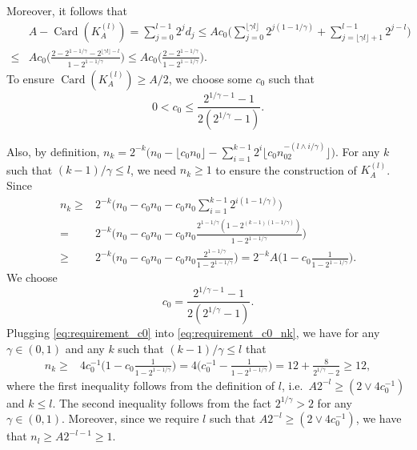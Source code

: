 \documentclass[11pt]{article}
\DeclareMathOperator*{\card}{Card}
\theoremstyle{plain}
\theoremstyle{definition}
\begin{document}
Moreover, it follows that
\begin{equation*}
\begin{aligned}
    &A - \card(K_A^{(l)}) = \sum_{j = 0}^{l-1}2^jd_j \leq Ac_0\Big(\sum_{j = 0}^{\lfloor \gamma l \rfloor}2^{j(1-1/\gamma)} + \sum_{j = \lfloor \gamma l \rfloor + 1}^{l-1}2^{j-l}\Big)\\
    \leq& Ac_0\Big(\frac{2 - 2^{1-1/\gamma} - 2^{\lfloor \gamma l\rfloor - l}}{1-2^{1-1/\gamma}}\Big) \leq Ac_0\Big(\frac{2 - 2^{1-1/\gamma}}{1-2^{1-1/\gamma}}\Big).
\end{aligned}
\end{equation*}
To ensure $\card(K_A^{(l)}) \geq A/2$, we choose some $c_0$ such that
\begin{equation}\label{eq:c0}
    0 < c_0 \leq \frac{2^{1/\gamma-1}-1}{2(2^{1/\gamma}-1)}. 
\end{equation}

Also, by definition, $n_k = 2^{-k}\big(n_0 - \lfloor c_0n_0 \rfloor - \sum_{i = 1}^{k-1}2^i\lfloor c_0n_02^{-(l \wedge i/\gamma)} \rfloor\big)$. For any $k$ such that $(k - 1)/\gamma \leq l$, we need $n_k \geq 1$ to ensure the construction of $K_A^{(l)}$. Since 
    \begin{equation}\label{eq:requirement_c0_nk}
    \begin{aligned}
        n_k \geq& 2^{-k}\Big(n_0 - c_0n_0 - c_0n_0\sum_{i = 1}^{k-1}2^{i(1-1/\gamma)}\Big)\\
        =& 2^{-k}\Big(n_0 - c_0n_0 - c_0n_0\frac{2^{1-1/\gamma}(1-2^{(k-1)(1-1/\gamma)})}{1-2^{1-1/\gamma}}\Big)\\
        \geq& 2^{-k}\Big(n_0 - c_0n_0 - c_0n_0\frac{2^{1-1/\gamma}}{1-2^{1-1/\gamma}}\Big) = 2^{-k}A\Big(1 - c_0\frac{1}{1-2^{1-1/\gamma}}\Big).
    \end{aligned}
    \end{equation}
    We choose 
    \begin{equation}\label{eq:requirement_c0}
    c_0 = \frac{2^{1/\gamma-1}-1}{2(2^{1/\gamma}-1)}.
    \end{equation}
    Plugging \eqref{eq:requirement_c0} into \eqref{eq:requirement_c0_nk}, we have for any $\gamma \in (0, 1)$ and any $k$ such that $(k - 1)/\gamma \leq l$ that
    \begin{equation*}
    \begin{aligned}
        n_k \geq& 4c_0^{-1}\Big(1 - c_0\frac{1}{1-2^{1-1/\gamma}}\Big) = 4\Big(c_0^{-1} - \frac{1}{1-2^{1-1/\gamma}}\Big)
        = 12 + \frac{8}{2^{1/\gamma}-2} \geq 12,
    \end{aligned}
    \end{equation*}
    where the first inequality follows from the definition of $l$, i.e.~$A2^{-l} \geq (2 \vee 4c_0^{-1})$ and $k \leq l$. The second inequality follows from the fact $2^{1/\gamma} > 2$ for any $\gamma \in (0,1)$.
    Moreover, since we require $l$ such that $A2^{-l} \geq (2 \vee 4c_0^{-1})$, we have that $n_l \geq A2^{-l-1} \geq 1$.
\end{document}
